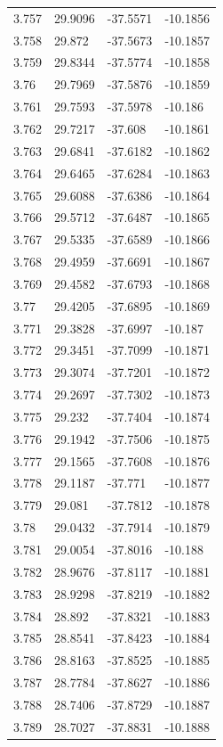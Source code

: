 \begin{tabular}{llll}
3.757 & 29.9096 & -37.5571 & -10.1856 \\
3.758 & 29.872 & -37.5673 & -10.1857 \\
3.759 & 29.8344 & -37.5774 & -10.1858 \\
3.76 & 29.7969 & -37.5876 & -10.1859 \\
3.761 & 29.7593 & -37.5978 & -10.186 \\
3.762 & 29.7217 & -37.608 & -10.1861 \\
3.763 & 29.6841 & -37.6182 & -10.1862 \\
3.764 & 29.6465 & -37.6284 & -10.1863 \\
3.765 & 29.6088 & -37.6386 & -10.1864 \\
3.766 & 29.5712 & -37.6487 & -10.1865 \\
3.767 & 29.5335 & -37.6589 & -10.1866 \\
3.768 & 29.4959 & -37.6691 & -10.1867 \\
3.769 & 29.4582 & -37.6793 & -10.1868 \\
3.77 & 29.4205 & -37.6895 & -10.1869 \\
3.771 & 29.3828 & -37.6997 & -10.187 \\
3.772 & 29.3451 & -37.7099 & -10.1871 \\
3.773 & 29.3074 & -37.7201 & -10.1872 \\
3.774 & 29.2697 & -37.7302 & -10.1873 \\
3.775 & 29.232 & -37.7404 & -10.1874 \\
3.776 & 29.1942 & -37.7506 & -10.1875 \\
3.777 & 29.1565 & -37.7608 & -10.1876 \\
3.778 & 29.1187 & -37.771 & -10.1877 \\
3.779 & 29.081 & -37.7812 & -10.1878 \\
3.78 & 29.0432 & -37.7914 & -10.1879 \\
3.781 & 29.0054 & -37.8016 & -10.188 \\
3.782 & 28.9676 & -37.8117 & -10.1881 \\
3.783 & 28.9298 & -37.8219 & -10.1882 \\
3.784 & 28.892 & -37.8321 & -10.1883 \\
3.785 & 28.8541 & -37.8423 & -10.1884 \\
3.786 & 28.8163 & -37.8525 & -10.1885 \\
3.787 & 28.7784 & -37.8627 & -10.1886 \\
3.788 & 28.7406 & -37.8729 & -10.1887 \\
3.789 & 28.7027 & -37.8831 & -10.1888 \\

\end{tabular}

